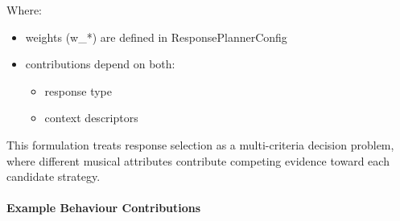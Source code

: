 Where:

\begin{itemize}
\item
  weights (w\_*) are defined in ResponsePlannerConfig
\item
  contributions depend on both:

  \begin{itemize}
  \item
    response type
  \item
    context descriptors
  \end{itemize}
\end{itemize}

This formulation treats response selection as a multi-criteria decision
problem, where different musical attributes contribute competing
evidence toward each candidate strategy.

\paragraph{Example Behaviour Contributions}\label{example-behaviour-contributions}

